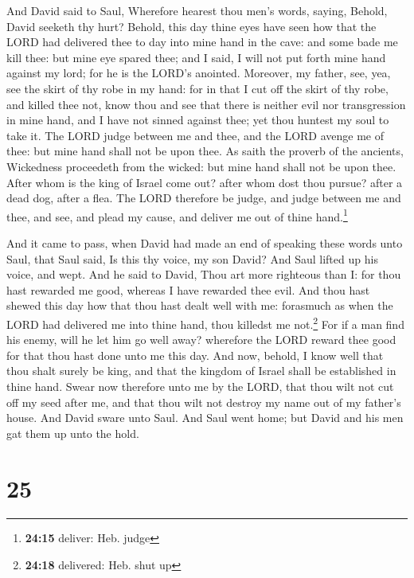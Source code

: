  And David said to Saul, Wherefore hearest thou men's
words, saying, Behold, David seeketh thy hurt?  Behold,
this day thine eyes have seen how that the LORD had delivered thee to
day into mine hand in the cave: and some bade me kill thee: but mine eye
spared thee; and I said, I will not put forth mine hand against my lord;
for he is the LORD's anointed.  Moreover, my father, see,
yea, see the skirt of thy robe in my hand: for in that I cut off the
skirt of thy robe, and killed thee not, know thou and see that there is
neither evil nor transgression in mine hand, and I have not sinned
against thee; yet thou huntest my soul to take it.  The
LORD judge between me and thee, and the LORD avenge me of thee: but mine
hand shall not be upon thee.  As saith the proverb of the
ancients, Wickedness proceedeth from the wicked: but mine hand shall not
be upon thee.  After whom is the king of Israel come out?
after whom dost thou pursue? after a dead dog, after a flea.
 The LORD therefore be judge, and judge between me and
thee, and see, and plead my cause, and deliver me out of thine
hand.\footnote{\textbf{24:15} deliver: Heb. judge}

 And it came to pass, when David had made an end of
speaking these words unto Saul, that Saul said, Is this thy voice, my
son David? And Saul lifted up his voice, and wept.  And
he said to David, Thou art more righteous than I: for thou hast rewarded
me good, whereas I have rewarded thee evil.  And thou
hast shewed this day how that thou hast dealt well with me: forasmuch as
when the LORD had delivered me into thine hand, thou killedst me
not.\footnote{\textbf{24:18} delivered: Heb. shut up} 
For if a man find his enemy, will he let him go well away? wherefore the
LORD reward thee good for that thou hast done unto me this day.
 And now, behold, I know well that thou shalt surely be
king, and that the kingdom of Israel shall be established in thine hand.
 Swear now therefore unto me by the LORD, that thou wilt
not cut off my seed after me, and that thou wilt not destroy my name out
of my father's house.  And David sware unto Saul. And
Saul went home; but David and his men gat them up unto the hold.

\hypertarget{section-24}{%
\section{25}\label{section-24}}

